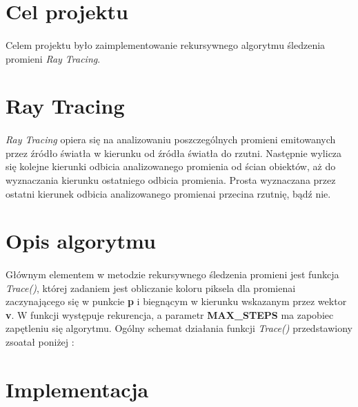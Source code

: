 \documentclass[wide,a4paper,titlepage,12pt] {article}
\begin{document}

\section{Cel projektu}
\paragraph{}
Celem projektu było zaimplementowanie rekursywnego algorytmu śledzenia promieni \textit{Ray Tracing}. 

\section{Ray Tracing}
\paragraph{}
\textit{Ray Tracing} opiera się na analizowaniu poszczególnych promieni emitowanych przez źródło światła w kierunku od źródła światła do rzutni. Następnie wylicza się kolejne kierunki odbicia analizowanego promienia od ścian obiektów, aż do wyznaczania kierunku ostatniego odbicia promienia. Prosta wyznaczana przez ostatni kierunek odbicia analizowanego promienai przecina rzutnię, bądź nie.

\section{Opis algorytmu}
\paragraph{}
Głównym elementem w metodzie rekursywnego śledzenia promieni jest funkcja \textit{Trace()}, której zadaniem jest obliczanie koloru piksela dla promienai zaczynającego się w punkcie \textbf{p} i biegnącym w kierunku wskazanym przez wektor \textbf{v}. W funkcji występuje rekurencja, a parametr \textbf{MAX\_STEPS} ma zapobiec zapętleniu się algorytmu. Ogólny schemat działania funkcji \textit{Trace()} przedstawiony zsoatał poniżej : 

\section{Implementacja}
\end{document}
